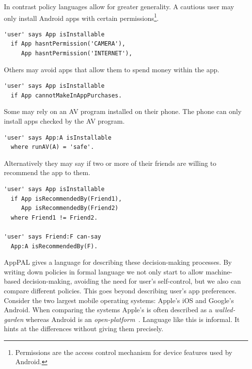 \documentclass[thesis.tex]{subfiles}
\begin{document}
In contrast policy languages allow for greater generality.
A cautious user may only install Android apps with certain permissions\footnote{Permissions are the access control mechanism for device features used by Android.}.
\begin{lstlisting}
'user' says App isInstallable
  if App hasntPermission('CAMERA'),
     App hasntPermission('INTERNET'),
\end{lstlisting}
Others may avoid apps that allow them to spend money within the app.
\begin{lstlisting}
'user' says App isInstallable
  if App cannotMakeInAppPurchases.
\end{lstlisting}
Some may rely on an \ac{AV} program installed on their phone.
The phone can only install apps checked by the \ac{AV} program.
\begin{lstlisting}
'user' says App:A isInstallable
  where runAV(A) = 'safe'.
\end{lstlisting}
Alternatively they may say if two or more of their friends are willing to recommend the app to them.
\begin{lstlisting}
'user' says App isInstallable
  if App isRecommendedBy(Friend1),
     App isRecommendedBy(Friend2)
  where Friend1 != Friend2.

'user' says Friend:F can-say
  App:A isRecommendedBy(F).
\end{lstlisting}

AppPAL gives a language for describing these decision-making processes. By
writing down policies in formal language we not only start to allow
machine-based decision-making, avoiding the need for user's self-control, but we
also can compare different policies. This goes beyond describing user's app
preferences. Consider the two largest mobile operating systems: Apple's iOS and
Google's Android. When comparing the systems Apple's is often described as a
\emph{walled-garden} whereas Android is an
\emph{open-platform}~\cite{barrera_secure_2011,enck_defending_2011}. Language
like this is informal. It hints at the differences without giving them
precisely.
\end{document}
